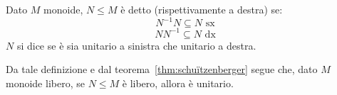 \begin{definition}
  Dato \(M\) monoide, \(N \leq M\) è detto  (rispettivamente a destra) se:
  \[N^{-1}N \subseteq N \text{ sx}\]
  \[NN^{-1} \subseteq N \text{ dx}\]
  \(N\) si dice  se è sia unitario a sinistra che unitario a destra.
\end{definition}

Da tale definizione e dal teorema~\ref{thm:schuïtzenberger} segue che, dato \(M\) monoide libero, se \(N \leq M\) è libero, allora è unitario.
